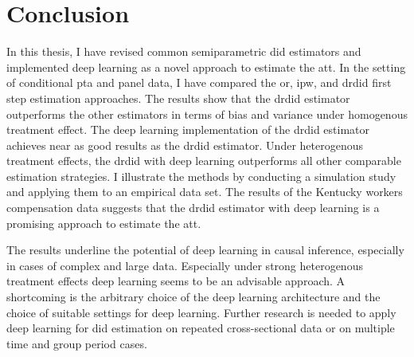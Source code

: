 \section{Conclusion}

In this thesis, I have revised common semiparametric \ac{did} estimators and implemented deep learning as a novel approach to estimate the \ac{att}.
In the setting of conditional \ac{pta} and panel data, I have compared the \ac{or}, \ac{ipw}, and \ac{drdid} first step estimation approaches.
The results show that the \ac{drdid} estimator outperforms the other estimators in terms of bias and variance under homogenous treatment effect.
The deep learning implementation of the \ac{drdid} estimator achieves near as good results as the \ac{drdid} estimator.
Under heterogenous treatment effects, the \ac{drdid} with deep learning outperforms all other comparable estimation strategies.
I illustrate the methods by conducting a simulation study and applying them to an empirical data set.
The results of the Kentucky workers compensation data suggests that the \ac{drdid} estimator with deep learning is a promising approach to estimate the \ac{att}.

The results underline the potential of deep learning in causal inference, especially in cases of complex and large data.
Especially under strong heterogenous treatment effects deep learning seems to be an advisable approach.
A shortcoming is the arbitrary choice of the deep learning architecture and the choice of suitable settings for deep learning.
Further research is needed to apply deep learning for \ac{did} estimation on repeated cross-sectional data or on multiple time and group period cases.

